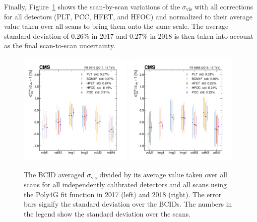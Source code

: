 Finally, Figure~\ref{fig:vdM_fit_sigVis_All} shows the scan-by-scan variations of the $\sigma_{\text{vis}}$ with all corrections for all detectors (PLT, PCC, HFET, and HFOC) and normalized to their average value taken over all scans to bring them onto the same scale. The average standard deviation of 0.26\% in 2017 and 0.27\% in 2018 is then taken into account as the final scan-to-scan uncertainty.


\begin{figure}[!h]
\centering
  \includegraphics[width=0.49\textwidth]{figures/visible_cross_section_results/sigVisPerScanNormalized_fill6016_XY_EC.pdf}
  \includegraphics[width=0.49\textwidth]{figures/visible_cross_section_results/sigVisPerScanNormalized_fill6868_XY_EC.pdf}
 \caption[$\sigma_{\text{vis}}$ Stability Across Scans for All Detectors (2017 & 2018)]{The BCID averaged  $\sigma_{\text{vis}}$ divided by its average value taken over all scans for all independently calibrated detectors and all scans using the Poly4G fit function in 2017 (left) and 2018 (right). The error bars signify the standard deviation over the BCIDs. The numbers in the legend show the standard deviation over the scans.}
\label{fig:vdM_fit_sigVis_All}
\end{figure}


